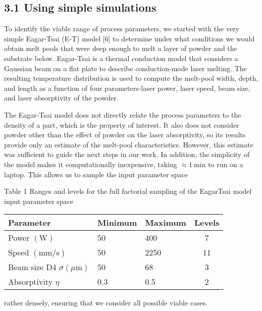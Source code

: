 \documentclass[10pt]{article}
\begin{document}
\subsection*{3.1 Using simple simulations}
To identify the viable range of process parameters, we started with the very simple Eagar-Tsai (E-T) model [6] to determine under what conditions we would obtain melt pools that were deep enough to melt a layer of powder and the substrate below. Eagar-Tsai is a thermal conduction model that considers a Gaussian beam on a flat plate to describe conduction-mode laser melting. The resulting temperature distribution is used to compute the melt-pool width, depth, and length as a function of four parameters-laser power, laser speed, beam size, and laser absorptivity of the powder.

The Eagar-Tsai model does not directly relate the process parameters to the density of a part, which is the property of interest. It also does not consider powder other than the effect of powder on the laser absorptivity, so its results provide only an estimate of the melt-pool characteristics. However, this estimate was sufficient to guide the next steps in our work. In addition, the simplicity of the model makes it computationally inexpensive, taking $\approx 1 \mathrm{~min}$ to run on a laptop. This allows us to sample the input parameter space

Table 1 Ranges and levels for the full factorial sampling of the EagarTsai model input parameter space

\begin{center}
\begin{tabular}{lllc}
\hline
Parameter & Minimum & Maximum & Levels \\
\hline
Power $(\mathrm{W})$ & 50 & 400 & 7 \\
Speed $(\mathrm{mm} / \mathrm{s})$ & 50 & 2250 & 11 \\
Beam size D4 $\sigma(\mu \mathrm{m})$ & 50 & 68 & 3 \\
Absorptivity $\eta$ & 0.3 & 0.5 & 2 \\
\hline
\end{tabular}
\end{center}

rather densely, ensuring that we consider all possible viable cases.
\end{document}
